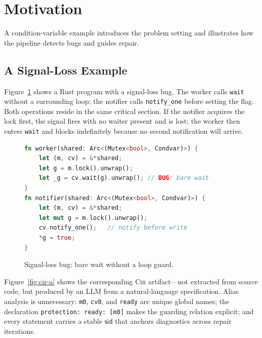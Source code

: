 \section{Motivation}
\label{sec:motivation}
A condition-variable example introduces the problem setting and illustrates how the pipeline detects bugs and guides repair.

\subsection{A Signal-Loss Example}
\label{subsec:running-example}

Figure~\ref{fig:example-a} shows a Rust program with a signal-loss bug. The worker calls \texttt{wait} without a surrounding loop; the notifier calls \texttt{notify\_one} before setting the flag. Both operations reside in the same critical section. If the notifier acquires the lock first, the signal fires with no waiter present and is lost; the worker then enters \texttt{wait} and blocks indefinitely because no second notification will arrive.

\begin{figure}[t]
\begin{lstlisting}[language=rust]
fn worker(shared: Arc<(Mutex<bool>, Condvar)>) {
    let (m, cv) = &*shared;
    let g = m.lock().unwrap();
    let _g = cv.wait(g).unwrap(); // BUG: bare wait
}
fn notifier(shared: Arc<(Mutex<bool>, Condvar)>) {
    let (m, cv) = &*shared;
    let mut g = m.lock().unwrap();
    cv.notify_one();   // notify before write
    *g = true;
}
\end{lstlisting}
\caption{Signal-loss bug: bare wait without a loop guard.}
\label{fig:example-a}
\end{figure}

Figure~\ref{fig:cir-a} shows the corresponding \textsc{Cir} artifact---not extracted from source code, but produced by an LLM from a natural-language specification. Alias analysis is unnecessary: \texttt{m0}, \texttt{cv0}, and \texttt{ready} are unique global names; the declaration \texttt{protection:\ ready:\ [m0]} makes the guarding relation explicit; and every statement carries a stable $\mathsf{sid}$ that anchors diagnostics across repair iterations.

